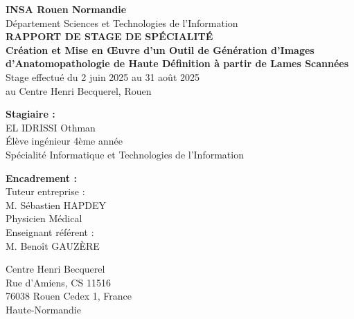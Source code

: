 \documentclass[12pt,a4paper]{report}
\begin{document}
\begin{titlepage}
\centering
\vspace*{1cm}

{\huge\bfseries INSA Rouen Normandie}\\[0.5cm]
{\large Département Sciences et Technologies de l'Information}\\[1.5cm]

{\Large\bfseries RAPPORT DE STAGE DE SPÉCIALITÉ}\\[1cm]

{\huge\bfseries Création et Mise en Œuvre d'un Outil de Génération d'Images d'Anatomopathologie de Haute Définition à partir de Lames Scannées}\\[2cm]

{\large Stage effectué du 2 juin 2025 au 31 août 2025}\\[0.5cm]
{\large au Centre Henri Becquerel, Rouen}\\[2cm]

\begin{minipage}{0.4\textwidth}
\begin{flushleft}
{\large\bfseries Stagiaire :}\\
EL IDRISSI Othman\\
Élève ingénieur 4ème année\\
Spécialité Informatique et Technologies de l'Information
\end{flushleft}
\end{minipage}
\hfill
\begin{minipage}{0.4\textwidth}
\begin{flushright}
{\large\bfseries Encadrement :}\\
Tuteur entreprise :\\
M. Sébastien HAPDEY\\
Physicien Médical\\[0.5cm]
Enseignant référent :\\
M. Benoît GAUZÈRE
\end{flushright}
\end{minipage}

\vfill

{\large Centre Henri Becquerel}\\
{\large Rue d'Amiens, CS 11516}\\
{\large 76038 Rouen Cedex 1, France}\\
{\large Haute-Normandie}

\end{titlepage}

\end{document}
